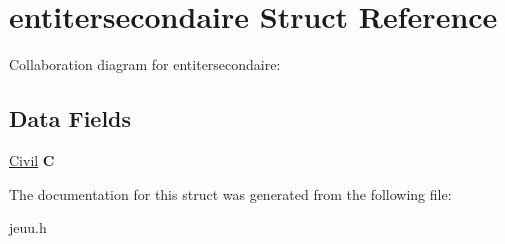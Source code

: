 \hypertarget{structentitersecondaire}{}\section{entitersecondaire Struct Reference}
\label{structentitersecondaire}


Collaboration diagram for entitersecondaire\+:
\subsection*{Data Fields}
\begin{DoxyCompactItemize}
\item 
\hyperlink{structCivil}{Civil} {\bfseries C}\hypertarget{structentitersecondaire_a6d0d184621e4fb0ed6278e371a978100}{}\label{structentitersecondaire_a6d0d184621e4fb0ed6278e371a978100}

\end{DoxyCompactItemize}


The documentation for this struct was generated from the following file\+:\begin{DoxyCompactItemize}
\item 
jeuu.\+h\end{DoxyCompactItemize}
